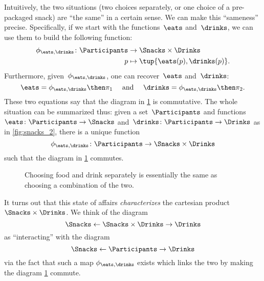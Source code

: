 Intuitively, the two situations (two choices separately, or one choice of a pre-packaged snack) are ``the same'' in a certain sense.
We can make this ``sameness'' precise.
Specifically, if we start with the functions~$\eats$ and~$\drinks$, we can use them to build the following function:
\begin{equation}\label{eq:snacks-building-univ-map}
  \begin{aligned}
    \phi_{\eats,\drinks}\colon \Participants&\to \Snacks\times \Drinks\\
    p&\mapsto \tup{\eats(p),\drinks(p)}.
  \end{aligned}
\end{equation}
Furthermore, given~$\phi_{\eats,\drinks}$, one can recover~$\eats$ and~$\drinks$:
\begin{equation}\label{eq:snacks-proj-univ-map}
  \eats =\phi_{\eats,\drinks}\then \pi_1 \quad  \text{ and } \quad \drinks=\phi_{\eats,\drinks}\then \pi_2.
\end{equation}
These two equations say that the diagram in \cref{fig:snacks_3} is commutative.
The whole situation can be summarized thus: given a set~$\Participants$ and functions~$\eats\colon \Participants \to \Snacks$ and~$\drinks\colon \Participants \to \Drinks$ as in \cref{fig:snacks_2}, there is a unique function~
\begin{equation}\label{eq:snacks-unique-univ-map}
\phi_{\eats,\drinks} \colon \Participants \to \Snacks \times \Drinks
\end{equation}
such that the diagram in \cref{fig:snacks_3} commutes. 

\begin{figure}[h!]
  \begin{center}
  \end{center}
  \caption{Choosing food and drink separately is essentially the same as choosing a combination of the two. }
  \label{fig:snacks_3}
\end{figure}

It turns out that this state of affairs \emph{characterizes} the cartesian product $\Snacks\times \Drinks$. We think of the diagram
\begin{equation}\label{eq:snacks-prod-diagram}
\Snacks \leftarrow \Snacks \times \Drinks \rightarrow \Drinks
\end{equation}
as ``interacting'' with the diagram 
\begin{equation}\label{eq:snacks-prod-test-diagram}
\Snacks \leftarrow \Participants \rightarrow \Drinks
\end{equation}
via the fact that such a map $\phi_{\eats,\drinks}$ exists which links the two by making the diagram \cref{fig:snacks_3} commute. 

